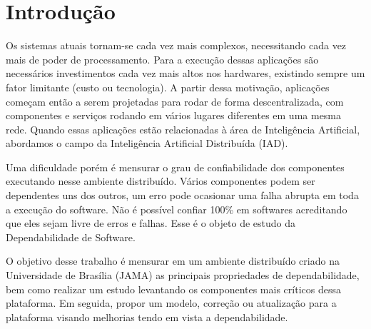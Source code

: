 \chapter{Introdução}

Os sistemas atuais tornam-se cada vez mais complexos, necessitando cada vez mais de poder de processamento. Para a execução dessas aplicações são necessários investimentos cada vez mais altos nos hardwares, existindo sempre um fator limitante (custo ou tecnologia). A partir dessa motivação, aplicações começam então a serem projetadas para rodar de forma descentralizada, com componentes e serviços rodando em vários lugares diferentes em uma mesma rede. Quando essas aplicações estão relacionadas à área de Inteligência Artificial, abordamos o campo da Inteligência Artificial Distribuída (IAD).

Uma dificuldade porém é mensurar o grau de confiabilidade dos componentes executando nesse ambiente distribuído. Vários componentes podem ser dependentes uns dos outros, um erro pode ocasionar uma falha abrupta em toda a execução do software. Não é possível confiar 100\% em softwares acreditando que eles sejam livre de erros e falhas. Esse é o objeto de estudo da Dependabilidade de Software.

O objetivo desse trabalho é mensurar em um ambiente distribuído criado na Universidade de Brasília (JAMA) as principais propriedades de dependabilidade, bem como realizar um estudo levantando os componentes mais críticos dessa plataforma. Em seguida, propor um modelo, correção ou atualização para a plataforma visando melhorias tendo em vista a dependabilidade. 

